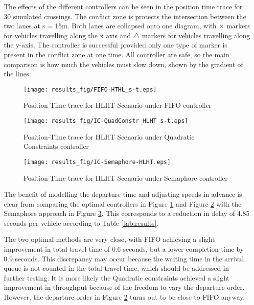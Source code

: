 The effects of the different controllers can be seen in the position time trace for 30 simulated crossings. The conflict zone is protects the intersection between the two lanes at s = 15m. Both lanes are collapsed onto one diagram, with $\times$ markers for vehicles travelling along the x axis and $\bigtriangleup$ markers for vehicles travelling along the y-axis. The controller is successful provided only one type of marker is present in the conflict zone at one time. All controller are safe, so the main comparison is how much the vehicles must slow down, shown by the gradient of the lines.  
\begin{figure}
	\texttt{[image: results\_fig/FIFO-HTHL\_s-t.eps]}
	\label{fig:fifo_hlht}
	\caption{Position-Time trace for HLHT Scenario under FIFO controller}
\end{figure}
\begin{figure}
	\texttt{[image: results\_fig/IC-QuadConstr\_HLHT\_s-t.eps]}
	\label{fig:quad_hlht}
	\caption{Position-Time trace for HLHT Scenario under Quadratic Constraints controller}
\end{figure}
\begin{figure}
	\texttt{[image: results\_fig/IC-Semaphore-HLHT.eps]}
	\label{fig:sema_hlht}
	\caption{Position-Time trace for HLHT Scenario under Semaphore controller}
\end{figure}
The benefit of modelling the departure time and adjusting speeds in advance is clear from comparing the optimal controllers in Figure \ref{fig:fifo_hlht} and Figure \ref{fig:quad_hlht} with the Semaphore approach in Figure \ref{fig:sema_hlht}. This corresponds to a reduction in delay of 4.85 seconds per vehicle according to Table \ref{tab:results}. 

The two optimal methods are very close, with FIFO achieving a slight improvement in total travel time of 0.6 seconds, but a lower completion time by 0.9 seconds. This discrepancy may occur because the waiting time in the arrival queue is not counted in the total travel time, which should be addressed in further testing. It is more likely the Quadratic constraints achieved a slight improvement in throughput because of the freedom to vary the departure order. However, the departure order in Figure \ref{fig:quad_hlht} turns out to be close to FIFO anyway.

